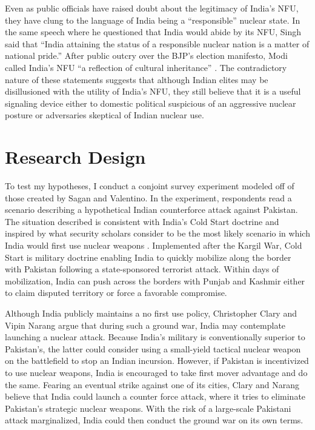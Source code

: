 \documentclass[12pt]{article}
\begin{document}
Even as public officials have raised doubt about the legitimacy of India's NFU, they have clung to the language of India being a “responsible” nuclear state. In the same speech where he questioned that India would abide by its NFU, Singh said that “India attaining the status of a responsible nuclear nation is a matter of national pride.” After public outcry over the BJP's election manifesto, Modi called India's NFU “a reflection of cultural inheritance” \citep{busvine_indias_2014}. The contradictory nature of these statements suggests that although Indian elites may be disillusioned with the utility of India's NFU, they still believe that it is a useful signaling device either to domestic political suspicious of an aggressive nuclear posture or adversaries skeptical of Indian nuclear use.

\section{Research Design}
To test my hypotheses, I conduct a conjoint survey experiment modeled off of those created by Sagan and Valentino. In the experiment, respondents read a scenario describing a hypothetical Indian counterforce attack against Pakistan. The situation described is consistent with India's Cold Start doctrine and inspired by what security scholars consider to be the most likely scenario in which India would first use nuclear weapons \citep{kapur_ten_2008, clary_indias_2019}. Implemented after the Kargil War, Cold Start is military doctrine enabling India to quickly mobilize along the border with Pakistan following a state-sponsored terrorist attack. Within days of mobilization, India can push across the borders with Punjab and Kashmir either to claim disputed territory or force a favorable compromise. 

Although India publicly maintains a no first use policy, Christopher Clary and Vipin Narang argue that during such a ground war, India may contemplate launching a nuclear attack. Because India's military is conventionally superior to Pakistan's, the latter could consider using a small-yield tactical nuclear weapon on the battlefield to stop an Indian incursion. However, if Pakistan is incentivized to use nuclear weapons, India is encouraged to take first mover advantage and do the same. Fearing an eventual strike against one of its cities, Clary and Narang believe that India could launch a counter force attack, where it tries to eliminate Pakistan's strategic nuclear weapons. With the risk of a large-scale Pakistani attack marginalized, India could then conduct the ground war on its own terms.
\end{document}
